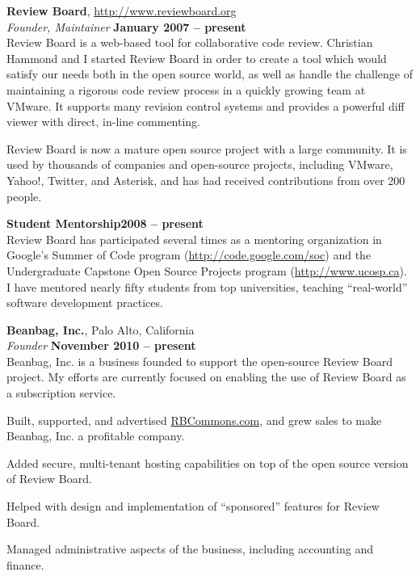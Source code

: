 \documentclass[margin,line]{resume}
\begin{document}
\begin{resume}
    {\bf Review Board}, \href{http://www.reviewboard.org}{http://www.reviewboard.org} \vspace{2mm}\\\vspace{1mm}%
    {\sl Founder, Maintainer} \hfill {\bf January 2007 -- present}\\
    Review Board is a web-based tool for collaborative code review. Christian
    Hammond and I started Review Board in order to create a tool which would
    satisfy our needs both in the open source world, as well as handle the
    challenge of maintaining a rigorous code review process in a quickly growing
    team at VMware. It supports many revision control systems and provides a
    powerful diff viewer with direct, in-line commenting.

    Review Board is now a mature open source project with a large community. It
    is used by thousands of companies and open-source projects, including
    VMware, Yahoo!, Twitter, and Asterisk, and has had received contributions
    from over 200 people.

    {\bf Student Mentorship}\hfill{\bf 2008 -- present}\vspace{2mm}\\
    Review Board has participated several times as a mentoring organization in
    Google's Summer of Code program
    (\href{http://code.google.com/soc}{http://code.google.com/soc})
    and the Undergraduate Capstone Open Source Projects program
    (\href{http://www.ucosp.ca}{http://www.ucosp.ca}). I have mentored nearly
    fifty students from top universities, teaching ``real-world'' software
    development practices.

    \newpage

    {\bf Beanbag, Inc.}, Palo Alto, California \vspace{2mm}\\\vspace{1mm}%
    {\sl Founder} \hfill {\bf November 2010 -- present }\\
    Beanbag, Inc. is a business founded to support the open-source Review Board
    project. My efforts are currently focused on enabling the use of Review
    Board as a subscription service.
    \vspace{3mm}
    \begin{list2}
    \item Built, supported, and advertised \href{http://rbcommons.com}{RBCommons.com},
          and grew sales to make Beanbag, Inc. a profitable company.
    \item Added secure, multi-tenant hosting capabilities on top of the open
          source version of Review Board.
    \item Helped with design and implementation of ``sponsored'' features for
          Review Board.
    \item Managed administrative aspects of the business, including accounting
          and finance.
    \end{list2}


\end{resume}
\end{document}
